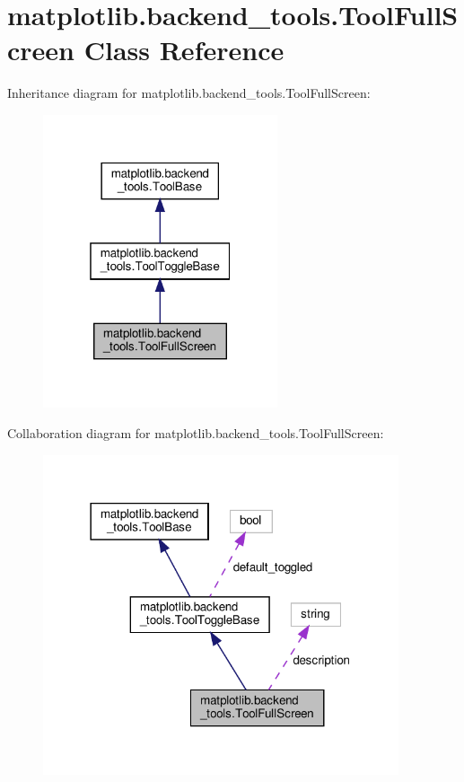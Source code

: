 \hypertarget{classmatplotlib_1_1backend__tools_1_1ToolFullScreen}{}\section{matplotlib.\+backend\+\_\+tools.\+Tool\+Full\+Screen Class Reference}
\label{classmatplotlib_1_1backend__tools_1_1ToolFullScreen}


Inheritance diagram for matplotlib.\+backend\+\_\+tools.\+Tool\+Full\+Screen\+:
\nopagebreak
\begin{figure}[H]
\begin{center}
\leavevmode
\includegraphics[width=196pt]{classmatplotlib_1_1backend__tools_1_1ToolFullScreen__inherit__graph}
\end{center}
\end{figure}


Collaboration diagram for matplotlib.\+backend\+\_\+tools.\+Tool\+Full\+Screen\+:
\nopagebreak
\begin{figure}[H]
\begin{center}
\leavevmode
\includegraphics[width=297pt]{classmatplotlib_1_1backend__tools_1_1ToolFullScreen__coll__graph}
\end{center}
\end{figure}
